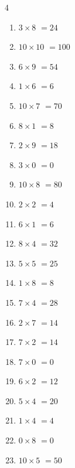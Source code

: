 \begin{multicols}{4}
\begin{enumerate}
  \item $3\times 8$
        $=24$

  \item $10\times 10$
        $=100$

  \item $6\times 9$
        $=54$

  \item $1\times 6$
        $=6$

  \item $10\times 7$
        $=70$

  \item $8\times 1$
        $=8$

  \item $2\times 9$
        $=18$

  \item $3\times 0$
        $=0$

  \item $10\times 8$
        $=80$

  \item $2\times 2$
        $=4$

  \item $6\times 1$
        $=6$

  \item $8\times 4$
        $=32$

  \item $5\times 5$
        $=25$

  \item $1\times 8$
        $=8$

  \item $7\times 4$
        $=28$

\columnbreak %

  \item $2\times 7$
        $=14$

  \item $7\times 2$
        $=14$

  \item $7\times 0$
        $=0$

  \item $6\times 2$
        $=12$

  \item $5\times 4$
        $=20$

  \item $1\times 4$
        $=4$

  \item $0\times 8$
        $=0$

  \item $10\times 5$
        $=50$


\end{enumerate}
\end{multicols}
